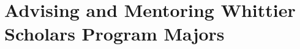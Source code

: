 \documentclass[../../main.tex]{subfiles}
\begin{document}
\begin{flushleft}

\end{flushleft}

\section{Advising and Mentoring Whittier Scholars Program Majors}
\label{sec:adv_wsp}

%

\begin{flushleft}

\end{flushleft}
\end{document}
